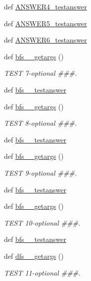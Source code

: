 \begin{DoxyCompactItemize}
\item 
def \hyperlink{namespacetests_aca248c5eda13a9aa0ae9995ccf628d7c}{A\+N\+S\+W\+E\+R4\+\_\+testanswer}
\item 
def \hyperlink{namespacetests_ab4ab469ad849bb2f1bbda29d91b2c4d8}{A\+N\+S\+W\+E\+R5\+\_\+testanswer}
\item 
def \hyperlink{namespacetests_a556cef5a2a9d16e56bcf24b60df6b73d}{A\+N\+S\+W\+E\+R6\+\_\+testanswer}
\item 
def \hyperlink{namespacetests_aa2f091505206cb051e59b0434fe7aa8d}{bfs\+\_\+\_\+getargs} ()
\begin{DoxyCompactList}\small\item\em T\+E\+S\+T 7-\/optional \#\#\#. \end{DoxyCompactList}\item 
def \hyperlink{namespacetests_a781ee09b8fcf0511a8c99edb509af839}{bfs\+\_\+\_\+testanswer}
\item 
def \hyperlink{namespacetests_a8a0b532e7dea5b21f8bc6a40e021b5ef}{bfs\+\_\+\_\+getargs} ()
\begin{DoxyCompactList}\small\item\em T\+E\+S\+T 8-\/optional \#\#\#. \end{DoxyCompactList}\item 
def \hyperlink{namespacetests_abdb6d295369350f9ece8d84e9b2eeeda}{bfs\+\_\+\_\+testanswer}
\item 
def \hyperlink{namespacetests_a6565ece79c98a41634c9397eaa67cf29}{bfs\+\_\+\_\+getargs} ()
\begin{DoxyCompactList}\small\item\em T\+E\+S\+T 9-\/optional \#\#\#. \end{DoxyCompactList}\item 
def \hyperlink{namespacetests_ab95b8408e8a03fc518ccf223a2985ecb}{bfs\+\_\+\_\+testanswer}
\item 
def \hyperlink{namespacetests_a979f2bdb361ca114ced7dcae41c155de}{bfs\+\_\+\_\+getargs} ()
\begin{DoxyCompactList}\small\item\em T\+E\+S\+T 10-\/optional \#\#\#. \end{DoxyCompactList}\item 
def \hyperlink{namespacetests_aa6d86ef450672e7f759bd9c7d095d6b5}{bfs\+\_\+\_\+testanswer}
\item 
def \hyperlink{namespacetests_af2580ae2857b8d058a8dbb879b18532c}{dfs\+\_\+\_\+getargs} ()
\begin{DoxyCompactList}\small\item\em T\+E\+S\+T 11-\/optional \#\#\#. \end{DoxyCompactList}\item 

\end{DoxyCompactItemize}
